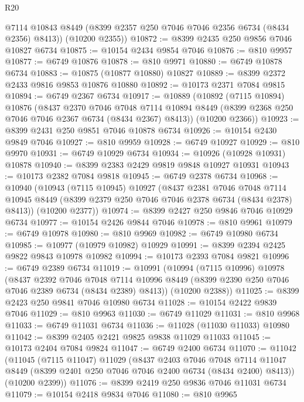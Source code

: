 \begin{lexlean}{R20}
\begin{coremodule}
{        @7114
        @10843
        @8449
        (@8399 @2357 @250 @7046 @7046 @2356 @6734 (@8434 @2356) @8413))
      (@10200 @2355))
@10872 := @8399 @2435 @250 @9856 @7046 @10827 @6734
@10875 := @10154 @2434 @9854 @7046
@10876 := @810 @9957
@10877 := @6749 @10876
@10878 := @810 @9971
@10880 := @6749 @10878 @6734
@10883 := @10875 (@10877 @10880) @10827
@10889 := @8399 @2372 @2433 @9816 @9853 @10876 @10880
@10892 := @10173 @2371 @7084 @9815
@10894 := @6749 @2367 @6734
@10917 := @10889
    (@10892
      (@7115 @10894)
      @10876
      (@8437
        @2370
        @7046
        @7048
        @7114
        @10894
        @8449
        (@8399 @2368 @250 @7046 @7046 @2367 @6734 (@8434 @2367) @8413))
      (@10200 @2366))
@10923 := @8399 @2431 @250 @9851 @7046 @10878 @6734
@10926 := @10154 @2430 @9849 @7046
@10927 := @810 @9959
@10928 := @6749 @10927
@10929 := @810 @9970
@10931 := @6749 @10929 @6734
@10934 := @10926 (@10928 @10931) @10878
@10940 := @8399 @2383 @2429 @9819 @9848 @10927 @10931
@10943 := @10173 @2382 @7084 @9818
@10945 := @6749 @2378 @6734
@10968 := @10940
    (@10943
      (@7115 @10945)
      @10927
      (@8437
        @2381
        @7046
        @7048
        @7114
        @10945
        @8449
        (@8399 @2379 @250 @7046 @7046 @2378 @6734 (@8434 @2378) @8413))
      (@10200 @2377))
@10974 := @8399 @2427 @250 @9846 @7046 @10929 @6734
@10977 := @10154 @2426 @9844 @7046
@10978 := @810 @9961
@10979 := @6749 @10978
@10980 := @810 @9969
@10982 := @6749 @10980 @6734
@10985 := @10977 (@10979 @10982) @10929
@10991 := @8399 @2394 @2425 @9822 @9843 @10978 @10982
@10994 := @10173 @2393 @7084 @9821
@10996 := @6749 @2389 @6734
@11019 := @10991
    (@10994
      (@7115 @10996)
      @10978
      (@8437
        @2392
        @7046
        @7048
        @7114
        @10996
        @8449
        (@8399 @2390 @250 @7046 @7046 @2389 @6734 (@8434 @2389) @8413))
      (@10200 @2388))
@11025 := @8399 @2423 @250 @9841 @7046 @10980 @6734
@11028 := @10154 @2422 @9839 @7046
@11029 := @810 @9963
@11030 := @6749 @11029
@11031 := @810 @9968
@11033 := @6749 @11031 @6734
@11036 := @11028 (@11030 @11033) @10980
@11042 := @8399 @2405 @2421 @9825 @9838 @11029 @11033
@11045 := @10173 @2404 @7084 @9824
@11047 := @6749 @2400 @6734
@11070 := @11042
    (@11045
      (@7115 @11047)
      @11029
      (@8437
        @2403
        @7046
        @7048
        @7114
        @11047
        @8449
        (@8399 @2401 @250 @7046 @7046 @2400 @6734 (@8434 @2400) @8413))
      (@10200 @2399))
@11076 := @8399 @2419 @250 @9836 @7046 @11031 @6734
@11079 := @10154 @2418 @9834 @7046
@11080 := @810 @9965
}
\end{coremodule}
\end{lexlean}
